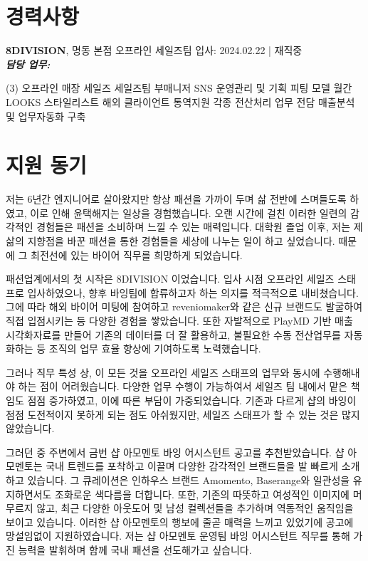 \documentclass[a4paper,10pt]{extarticle}
\begin{document}
\section*{경력사항}
\noindent
{\large\textbf{8DIVISION}}, 명동 본점 오프라인 세일즈팀 \hfill 입사: 2024.02.22 | 재직중\\
{\textbf{\textit{담당 업무:}}}
\begin{tasks}[style=itemize](3)
	\task 오프라인 매장 세일즈
	\task 세일즈팀 부매니저
	\task SNS 운영관리 및 기획
	\task 피팅 모델
	\task 월간 LOOKS 스타일리스트
	\task 해외 클라이언트 통역지원
	\task 각종 전산처리 업무 전담
	\task 매출분석 및 업무자동화 구축
\end{tasks}

\section*{지원 동기}
저는 6년간 엔지니어로 살아왔지만 항상 패션을 가까이 두며 삶 전반에 스며들도록 하였고, 이로 인해 윤택해지는 일상을 경험했습니다. 오랜 시간에 걸친 이러한 일련의 감각적인 경험들은 패션을 소비하며 느낄 수 있는 매력입니다. 대학원 졸업 이후, 저는 제 삶의 지향점을 바꾼 패션을 통한 경험들을 세상에 나누는 일이 하고 싶었습니다. 때문에 그 최전선에 있는 바이어 직무를 희망하게 되었습니다.

패션업계에서의 첫 시작은 8DIVISION 이었습니다. 입사 시점 오프라인 세일즈 스태프로 입사하였으나, 향후 바잉팀에 합류하고자 하는 의지를 적극적으로 내비쳤습니다. 그에 따라 해외 바이어 미팅에 참여하고 reveniomaker와 같은 신규 브랜드도 발굴하여 직접 입점시키는 등 다양한 경험을 쌓았습니다. 또한 자발적으로 PlayMD 기반 매출 시각화자료를 만들어 기존의 데이터를 더 잘 활용하고, 불필요한 수동 전산업무를 자동화하는 등 조직의 업무 효율 향상에 기여하도록 노력했습니다.

그러나 직무 특성 상, 이 모든 것을 오프라인 세일즈 스태프의 업무와 동시에 수행해내야 하는 점이 어려웠습니다. 다양한 업무 수행이 가능하여서 세일즈 팀 내에서 맡은 책임도 점점 증가하였고, 이에 따른 부담이 가중되었습니다. 기존과 다르게 샵의 바잉이 점점 도전적이지 못하게 되는 점도 아쉬웠지만, 세일즈 스태프가 할 수 있는 것은 많지 않았습니다.

그러던 중 주변에서 금번 샵 아모멘토 바잉 어시스턴트 공고를 추천받았습니다. 샵 아모멘토는 국내 트렌드를 포착하고 이끌며 다양한 감각적인 브랜드들을 발 빠르게 소개하고 있습니다. 그 큐레이션은 인하우스 브랜드 Amomento, Baserange와 일관성을 유지하면서도 조화로운 색다름을 더합니다. 또한, 기존의 따뜻하고 여성적인 이미지에 머무르지 않고, 최근 다양한 아웃도어 및 남성 컬렉션들을 추가하며 역동적인 움직임을 보이고 있습니다. 이러한 샵 아모멘토의 행보에 줄곧 매력을 느끼고 있었기에 공고에 망설임없이 지원하였습니다. 저는 샵 아모멘토 운영팀 바잉 어시스턴트 직무를 통해 가진 능력을 발휘하며 함께 국내 패션을 선도해가고 싶습니다.
\end{document}
